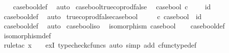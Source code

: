 \begin{isabellebody}
%
\isadelimproof
\ \ %
\endisadelimproof
%
\isatagproof
{}\isamarkupfalse%
\ case{\isacharunderscore}{\kern0pt}bool{\isacharunderscore}{\kern0pt}def{}\ \isamarkupfalse%
\ auto%
\endisatagproof
{\isafoldproof}%
%
\isadelimproof
\isanewline
%
\endisadelimproof
\isanewline
{}\isamarkupfalse%
\ case{\isacharunderscore}{\kern0pt}bool{\isacharunderscore}{\kern0pt}true{\isacharunderscore}{\kern0pt}coprod{\isacharunderscore}{\kern0pt}false{\isacharcolon}{\kern0pt}\isanewline
\ \ {\isachardoublequoteopen}case{\isacharunderscore}{\kern0pt}bool\ {\isasymcirc}\isactrlsub c\ {\isacharparenleft}{\kern0pt}{\isasymt}\ {\isasymamalg}\ {\isasymf}{\isacharparenright}{\kern0pt}\ {\isacharequal}{\kern0pt}\ id\ {\isacharparenleft}{\kern0pt}{\isasymone}\ {\isasymCoprod}\ {\isasymone}{\isacharparenright}{\kern0pt}{\isachardoublequoteclose}\isanewline
%
\isadelimproof
\ \ %
\endisadelimproof
%
\isatagproof
{}\isamarkupfalse%
\ case{\isacharunderscore}{\kern0pt}bool{\isacharunderscore}{\kern0pt}def{}\ \isamarkupfalse%
\ auto%
\endisatagproof
{\isafoldproof}%
%
\isadelimproof
\isanewline
%
\endisadelimproof
\isanewline
{}\isamarkupfalse%
\ true{\isacharunderscore}{\kern0pt}coprod{\isacharunderscore}{\kern0pt}false{\isacharunderscore}{\kern0pt}case{\isacharunderscore}{\kern0pt}bool{\isacharcolon}{\kern0pt}\isanewline
\ \ {\isachardoublequoteopen}{\isacharparenleft}{\kern0pt}{\isasymt}\ {\isasymamalg}\ {\isasymf}{\isacharparenright}{\kern0pt}\ {\isasymcirc}\isactrlsub c\ case{\isacharunderscore}{\kern0pt}bool\ {\isacharequal}{\kern0pt}\ id\ {\isasymOmega}{\isachardoublequoteclose}\isanewline
%
\isadelimproof
\ \ %
\endisadelimproof
%
\isatagproof
{}\isamarkupfalse%
\ case{\isacharunderscore}{\kern0pt}bool{\isacharunderscore}{\kern0pt}def{}\ \isamarkupfalse%
\ auto%
\endisatagproof
{\isafoldproof}%
%
\isadelimproof
\isanewline
%
\endisadelimproof
\isanewline
{}\isamarkupfalse%
\ case{\isacharunderscore}{\kern0pt}bool{\isacharunderscore}{\kern0pt}iso{\isacharcolon}{\kern0pt}\isanewline
\ \ {\isachardoublequoteopen}isomorphism\ case{\isacharunderscore}{\kern0pt}bool{\isachardoublequoteclose}\isanewline
%
\isadelimproof
\ \ %
\endisadelimproof
%
\isatagproof
{}\isamarkupfalse%
\ case{\isacharunderscore}{\kern0pt}bool{\isacharunderscore}{\kern0pt}def{}\ \isamarkupfalse%
\ isomorphism{\isacharunderscore}{\kern0pt}def\isanewline
\ \ \isamarkupfalse%
\ {\isacharparenleft}{\kern0pt}rule{\isacharunderscore}{\kern0pt}tac\ x{\isacharequal}{\kern0pt}{\isachardoublequoteopen}{\isasymt}\ {\isasymamalg}\ {\isasymf}{\isachardoublequoteclose}\ \ exI{\isacharcomma}{\kern0pt}\ typecheck{\isacharunderscore}{\kern0pt}cfuncs{\isacharcomma}{\kern0pt}\ auto\ simp\ add{\isacharcolon}{\kern0pt}\ cfunc{\isacharunderscore}{\kern0pt}type{\isacharunderscore}{\kern0pt}def{\isacharparenright}{\kern0pt}%

\end{isabellebody}
